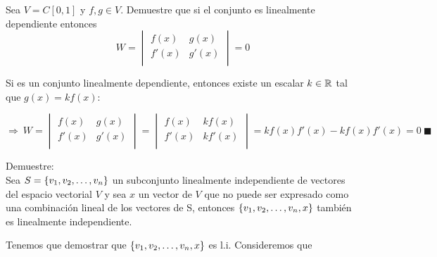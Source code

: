 \begin{enumerate}

\begin{prob}
Sea $V=C[0,1]$ y $f, g \in V$. Demuestre que si el conjunto  es linealmente dependiente entonces
\[W=
\begin{vmatrix}
f(x)&g(x)\\
f'(x)&g'(x)\\
\end{vmatrix}=0
\]
\end{prob}
\sol
Si  es un conjunto linealmente dependiente, entonces existe un escalar $k\in \mathbb{R}$ tal que $g(x)=kf(x)$:

\[\Rightarrow\
W=
\begin{vmatrix}
f(x)&g(x)\\
f'(x)&g'(x)\\
\end{vmatrix}
=
\begin{vmatrix}
f(x)&kf(x)\\
f'(x)&kf'(x)\\
\end{vmatrix}
=
kf(x)f'(x)-kf(x)f'(x)=0
\ \blacksquare\]

\begin{prob}
Demuestre:
\\Sea $S= \lbrace v_1, v_2, \ldots, v_n \rbrace$ un subconjunto linealmente independiente de vectores del espacio vectorial $V$ y sea $x$ un vector de $V$ que no puede ser expresado como una combinaci\'on lineal de los vectores de S, entonces $ \left\{ v_1, v_2, \ldots, v_n, x \right\} $
tambi\'en es linealmente independiente.
\end{prob}

\sol
Tenemos que demostrar que $ \left\{ v_1, v_2, \ldots, v_n, x \right\} $ es l.i.
Consideremos que


\end{enumerate}
